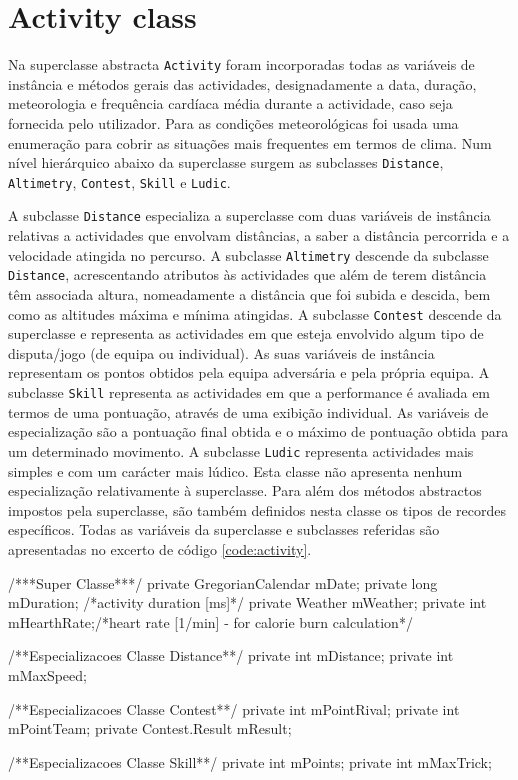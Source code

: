 \documentclass[a4paper,10pt]{report}
\begin{document}
\section{Activity class}
\label{sec:activity}
Na superclasse abstracta \verb!Activity! foram incorporadas todas as variáveis de instância e métodos gerais das actividades, 
designadamente a data, duração, meteorologia e frequência cardíaca média durante a actividade, caso seja fornecida pelo utilizador.
Para as condições meteorológicas foi usada uma enumeração para cobrir as situações mais frequentes em termos de clima.
Num nível hierárquico abaixo da superclasse surgem as subclasses \verb!Distance!, \verb!Altimetry!, \verb!Contest!, \verb!Skill! e \verb!Ludic!.

A subclasse \verb!Distance! especializa a superclasse com duas variáveis de instância relativas a actividades que envolvam distâncias, a saber a 
distância percorrida e a velocidade atingida no percurso.
A subclasse \verb!Altimetry! descende da subclasse \verb!Distance!, acrescentando atributos às actividades que além de terem distância têm associada altura, 
nomeadamente a distância que foi subida e descida, bem como as altitudes máxima e mínima atingidas.
A subclasse \verb!Contest! descende da superclasse e representa as actividades em que esteja envolvido algum tipo de disputa/jogo (de equipa ou individual).
As suas variáveis de instância representam os pontos obtidos pela equipa adversária e pela própria equipa.
A subclasse \verb!Skill! representa as actividades em que a performance é avaliada em termos de uma pontuação, através de uma exibição individual.
As variáveis de especialização são a pontuação final obtida e o máximo de pontuação obtida para um determinado movimento.
A subclasse \verb!Ludic! representa actividades mais simples e com um carácter mais lúdico. Esta classe não apresenta nenhum especialização relativamente à 
superclasse. Para além dos métodos abstractos impostos pela superclasse, são também definidos nesta classe os tipos de recordes específicos.
Todas as variáveis da superclasse e subclasses referidas são apresentadas no excerto de código \ref{code:activity}.

\begin{code}[caption=Variáveis de instância da superclasse Activity e subclasses respectivas (src/model/activity)., label=code:activity]
/***Super Classe***/
private GregorianCalendar mDate;
private long mDuration; /*activity duration [ms]*/
private Weather mWeather;
private int mHearthRate;/*heart rate [1/min] - for calorie burn calculation*/

/**Especializacoes Classe Distance**/
private int mDistance;
private int mMaxSpeed;

/**Especializacoes Classe Contest**/
private int mPointRival;
private int mPointTeam;
private Contest.Result mResult;

/**Especializacoes Classe Skill**/
private int mPoints;
private int mMaxTrick;
\end{code}
\end{document}
